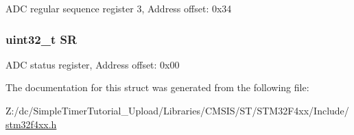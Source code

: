 A\-D\-C regular sequence register 3, Address offset\-: 0x34 \hypertarget{struct_a_d_c___type_def_af6aca2bbd40c0fb6df7c3aebe224a360}{
\subsubsection[{S\-R}]{ uint32\-\_\-t S\-R}}\label{struct_a_d_c___type_def_af6aca2bbd40c0fb6df7c3aebe224a360}
A\-D\-C status register, Address offset\-: 0x00 

The documentation for this struct was generated from the following file\-:\begin{DoxyCompactItemize}
\item 
Z\-:/dc/\-Simple\-Timer\-Tutorial\-\_\-\-Upload/\-Libraries/\-C\-M\-S\-I\-S/\-S\-T/\-S\-T\-M32\-F4xx/\-Include/\hyperlink{stm32f4xx_8h}{stm32f4xx.\-h}\end{DoxyCompactItemize}
